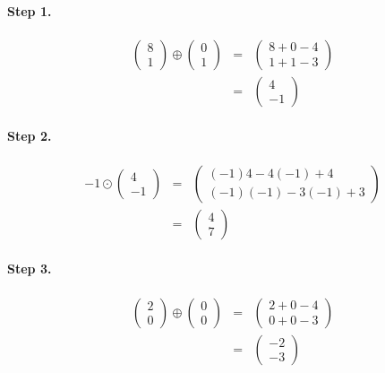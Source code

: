 \documentclass[11pt]{article}
\begin{document}
\paragraph{Step 1.}
\begin{eqnarray*}
\begin{pmatrix}
8\\
1
\end{pmatrix}
\oplus
\begin{pmatrix}
0\\
1
\end{pmatrix}
&=&
\begin{pmatrix}
8+0-4\\
1+1-3
\end{pmatrix}
\\
&=&
\begin{pmatrix}
4\\
-1
\end{pmatrix}
\end{eqnarray*}
\paragraph{Step 2.}
\begin{eqnarray*}
-1
\odot
\begin{pmatrix}
4\\
-1
\end{pmatrix}
&=&
\begin{pmatrix}
(-1)4-4(-1)+4\\
(-1)(-1)-3(-1)+3
\end{pmatrix}
\\&=&
\begin{pmatrix}
4\\
7
\end{pmatrix}
\end{eqnarray*}
\paragraph{Step 3.}
\begin{eqnarray*}
\begin{pmatrix}
2\\
0
\end{pmatrix}
\oplus
\begin{pmatrix}
0\\
0
\end{pmatrix}
&=&
\begin{pmatrix}
2+0-4\\
0+0-3
\end{pmatrix}
\\ &=&
\begin{pmatrix}
-2\\
-3
\end{pmatrix}
\end{eqnarray*}
\end{document}
